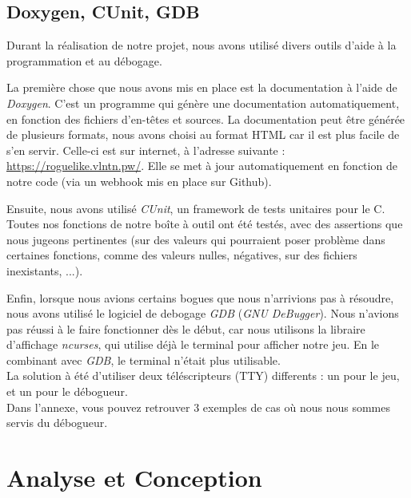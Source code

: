 \documentclass[11pt]{report}
\begin{document}
	\section{Doxygen, CUnit, GDB}
	
		Durant la réalisation de notre projet, nous avons utilisé divers outils d'aide à la programmation et au débogage. 
		
		\vspace{12pt}		
		
		La première chose que nous avons mis en place est la documentation à l'aide de \emph{Doxygen}. C'est un programme qui génère une documentation automatiquement, en fonction des fichiers d'en-têtes et sources. La documentation peut être générée de plusieurs formats, nous avons choisi au format HTML car il est plus facile de s'en servir. Celle-ci est sur internet, à l'adresse suivante : \url{https://roguelike.vlntn.pw/}. Elle se met à jour automatiquement en fonction de notre code (via un webhook mis en place sur Github).
		
		\vspace{12pt}
		
		Ensuite, nous avons utilisé \emph{CUnit}, un framework de tests unitaires pour le C. Toutes nos fonctions de notre boîte à outil ont été testés, avec des assertions que nous jugeons pertinentes (sur des valeurs qui pourraient poser problème dans certaines fonctions, comme des valeurs nulles, négatives, sur des fichiers inexistants, ...).
		
		\vspace{12pt}
		
		Enfin, lorsque nous avions certains bogues que nous n'arrivions pas à résoudre, nous avons utilisé le logiciel de debogage \emph{GDB} (\emph{GNU DeBugger}). Nous n'avions pas réussi à le faire fonctionner dès le début, car nous utilisons la libraire d'affichage \emph{ncurses}, qui utilise déjà le terminal pour afficher notre jeu. En le combinant avec \emph{GDB}, le terminal n'était plus utilisable.\\
		La solution à été d'utiliser deux téléscripteurs (\textsc{TTY}) differents : un pour le jeu, et un pour le débogueur.\\
		Dans l'annexe, vous pouvez retrouver 3 exemples de cas où nous nous sommes servis du débogueur.

\chapter{Analyse et Conception}
\end{document}
